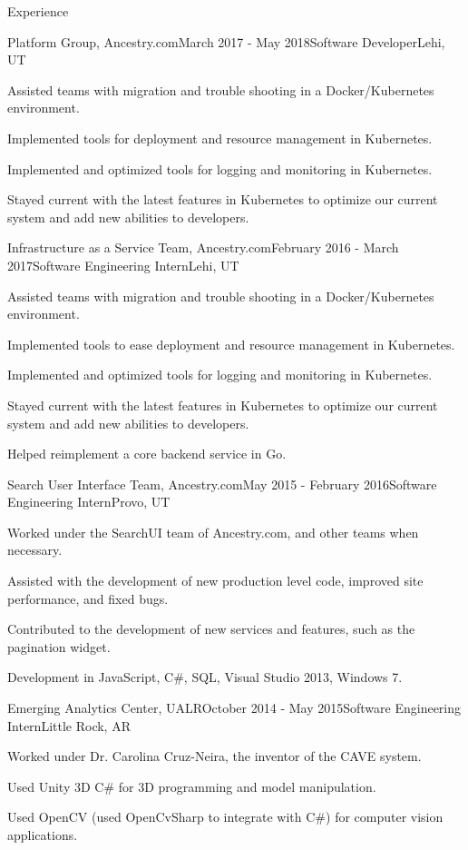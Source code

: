 \documentclass{resume} %
\begin{document}
\begin{rSection}{Experience}
  \begin{rSubsection}{Platform Group, Ancestry.com}{March 2017 - May 2018}{Software Developer}{Lehi, UT}
  \item Assisted teams with migration and trouble shooting in a Docker/Kubernetes environment.
  \item Implemented tools for deployment and resource management in Kubernetes.
  \item Implemented and optimized tools for logging and monitoring in Kubernetes.
  \item Stayed current with the latest features in Kubernetes to optimize our current system and add new abilities to developers. 
  \end{rSubsection}
  
  \begin{rSubsection}{Infrastructure as a Service Team, Ancestry.com}{February 2016 - March 2017}{Software Engineering Intern}{Lehi, UT}
  \item Assisted teams with migration and trouble shooting in a Docker/Kubernetes environment.
  \item Implemented tools to ease deployment and resource management in Kubernetes.
  \item Implemented and optimized tools for logging and monitoring in Kubernetes.
  \item Stayed current with the latest features in Kubernetes to optimize our current system and add new abilities to developers.
  \item Helped reimplement a core backend service in Go.
  \end{rSubsection}

  \begin{rSubsection}{Search User Interface Team, Ancestry.com}{May 2015 - February 2016}{Software Engineering Intern}{Provo, UT}
  \item Worked under the SearchUI team of Ancestry.com, and other teams when necessary.
  \item Assisted with the development of new production level code, improved site performance, and fixed bugs.
  \item Contributed to the development of new services and features, such as the pagination widget.
  \item Development in JavaScript, C\#, SQL, Visual Studio 2013, Windows 7.
  \end{rSubsection}

  \begin{rSubsection}{Emerging Analytics Center, UALR}{October 2014 - May 2015}{Software Engineering Intern}{Little Rock, AR}
  \item Worked under Dr. Carolina Cruz-Neira, the inventor of the CAVE system.
  \item Used Unity 3D C\# for 3D programming and model manipulation.
  \item Used OpenCV (used OpenCvSharp to integrate with C\#) for computer vision applications.
  \end{rSubsection}


\end{rSection}
\end{document}
